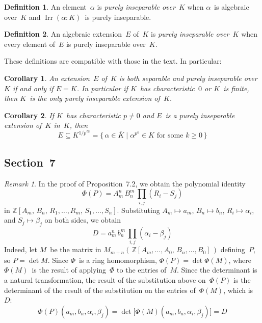 \documentclass[letterpaper,12pt]{article}
\newcommand{\Z}{\mathbb{Z}}
\newcommand{\ac}{\overline}
\DeclareMathOperator{\Irr}{Irr}
\theoremstyle{definition}
\newtheorem*{defn}{Definition}
\theoremstyle{remark}
\newtheorem*{rmk}{Remark}
\theoremstyle{plain}
\newtheorem*{cor}{Corollary}
\begin{document}
\begin{defn}
An element~\(\alpha\) is \emph{purely inseparable over~\(K\)} when \(\alpha\)~is algebraic over~\(K\) and \(\Irr(\alpha:K)\)~is purely inseparable.
\end{defn}

\begin{defn}
An algebraic extension~\(E\) of~\(K\) is \emph{purely inseparable over~\(K\)} when every element of~\(E\) is purely inseparable over~\(K\).
\end{defn}

\noindent These definitions are compatible with those in the text. In particular:

\begin{cor}
An extension~\(E\) of~\(K\) is both separable and purely inseparable over~\(K\) if and only if \(E=K\). In particular if \(K\)~has characteristic~\(0\) or \(K\)~is finite, then \(K\)~is the only purely inseparable extension of~\(K\).
\end{cor}

\begin{cor}
If \(K\)~has characteristic \(p\ne 0\) and \(E\)~is a purely inseparable extension of~\(K\) in~\(\ac{K}\), then
\[E\subseteq K^{1/p^{\infty}}=\bigl\{\,\alpha\in\ac{K}\mid\alpha^{p^k}\in K\text{ for some }k\ge 0\,\bigr\}\]
\end{cor}

\subsection*{Section~7}
\begin{rmk}
In the proof of Proposition~7.2, we obtain the polynomial identity
\[\Phi(P)=A_m^n\,B_n^m\,\prod_{i,j}(R_i-S_j)\]
in \(\Z[A_m,\,B_n,\,R_1,\ldots,R_m,\,S_1,\ldots,S_n]\). Substituting \(A_m\mapsto a_m\), \(B_n\mapsto b_n\), \(R_i\mapsto\alpha_i\), and \(S_j\mapsto\beta_j\) on both sides, we obtain
\[D=a_m^n\,b_n^m\,\prod_{i,j}(\alpha_i-\beta_j)\]
Indeed, let \(M\)~be the matrix in \(M_{m+n}(\,\Z[A_m,\ldots,A_0,\,B_n,\ldots,B_0]\,)\) defining~\(P\), so \(P=\det M\). Since \(\Phi\)~is a ring homomorphism, \(\Phi(P)=\det\Phi(M)\), where \(\Phi(M)\)~is the result of applying~\(\Phi\) to the entries of~\(M\). Since the determinant is a natural transformation, the result of the substitution above on~\(\Phi(P)\) is the determinant of the result of the substitution on the entries of~\(\Phi(M)\), which is~\(D\):
\[\Phi(P)(a_m,b_n,\alpha_i,\beta_j)=\det\bigl[\Phi(M)(a_m,b_n,\alpha_i,\beta_j)\bigr]=D\]
\end{rmk}
\end{document}

